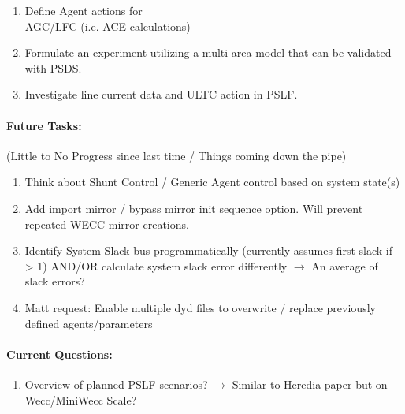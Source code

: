 \documentclass[12pt]{article}
\begin{document}
\begin{multicols}{2}
\begin{enumerate}
		\item Define Agent actions for \\ AGC/LFC (i.e. ACE calculations)

		\item Formulate an experiment utilizing a multi-area model that can be validated with PSDS.

		\item Investigate line current data and ULTC action in PSLF.

		
		

	\end{enumerate}
\vfill\null
\columnbreak

\paragraph{Future Tasks:}(Little to No Progress since last time / Things coming down the pipe)
	\begin{enumerate}
		\item Think about Shunt Control / Generic Agent control based on system state(s)
		\item Add import mirror / bypass mirror init sequence option. Will prevent repeated WECC mirror creations.

		\item Identify System Slack bus programmatically (currently assumes first slack if > 1)
		\subitem AND/OR calculate system slack error differently $\rightarrow$ An average of slack errors?

		\item Matt request: Enable multiple dyd files to overwrite / replace previously defined agents/parameters
		
		
	\end{enumerate}
	\paragraph{Current Questions:}
	\begin{enumerate}
		\item Overview of planned PSLF scenarios? $\rightarrow$ Similar to Heredia paper but on Wecc/MiniWecc Scale? 
		

\end{enumerate}
\end{multicols}
\end{document}
